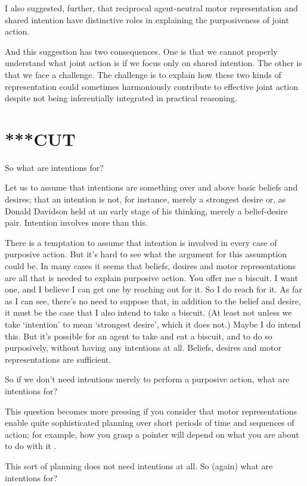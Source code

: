 \documentclass[12pt,\papersize]{extarticle}
\begin{document}
I also suggested, further, that
reciprocal agent-neutral motor representation
and
shared intention  
have distinctive roles in explaining the purposiveness of joint action.

And this suggestion has two consequences.
One is that we cannot properly understand what joint action is if we focus only on shared intention.
The other is that we face a challenge.
The challenge is to explain how these two kinds of representation could sometimes harmoniously contribute to effective joint action despite not being inferentially integrated in practical reasoning.


\section{***CUT}
So what are intentions for?

Let us to assume that intentions are something over and above basic beliefs and desires; that an intention is not, for instance, merely a strongest desire or, as Donald Davidson held at an early stage of his thinking, merely a belief-desire pair.
Intention involves more than this.

There is a temptation to assume that intention is involved in every case of purposive action.
But it’s hard to see what the argument for this assumption could be.
In many cases it seems that beliefs, desires and motor representations are all that is needed to explain purposive action. 
You offer me a biscuit.  I want one, and I believe I can get one by reaching out for it.  So I do reach for it.  As far as I can see, there’s no need to suppose that, in addition to the belief and desire, it must be the case that I also intend to take a biscuit.  
(At least not unless we take ‘intention’ to mean ‘strongest desire’, which it does not.)  
Maybe I do intend this.  
But it’s possible for an agent to take and eat a biscuit, and to do so purposively, without having any intentions at all.  
Beliefs, desires and motor representations are sufficient.

So if we don't need intentions merely to perform a purposive action, what are intentions for?

This question becomes more pressing if you consider that motor representations enable quite sophisticated planning over short periods of time and sequences of action; for example, how you grasp a pointer will depend on what you are about to do with it \citep{zhang:2007_planning}.

This sort of planning does not need intentions at all.  So (again) what are intentions for?
\end{document}
